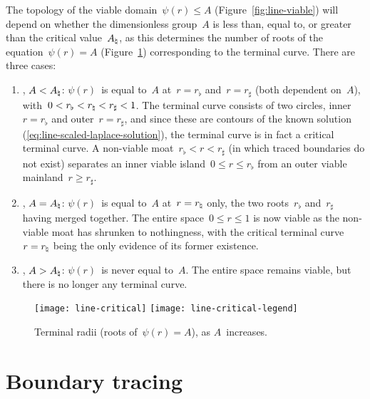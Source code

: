 The topology of the viable domain~$\psi (r) \le A$
(Figure~\ref{fig:line-viable})
will depend on whether the dimensionless group~$A$ is
less than, equal to, or greater than the critical value~$A_\natural$,
as this determines the number of roots of the equation~$\psi (r) = A$
(Figure~\ref{fig:line-critical})
corresponding to the terminal curve.
There are three cases:
\begin{enumerate}
  \item
  \label{itm:polar.cases.hot}
    , $A < A_\natural$:
    $\psi (r)$~is equal to~$A$ at~$r = r_\flat$ and~$r = r_\sharp$
    (both dependent on~$A$),
    with~$0 <  r_\flat < r_\natural < r_\sharp < 1$.
    The terminal curve consists of two circles,
    inner~$r = r_\flat$ and outer~$r = r_\sharp$,
    and since these are contours of the known solution~%
      (\ref{eq:line-scaled-laplace-solution}),
    the terminal curve is in fact a critical terminal curve.
    A non-viable moat~$r_\flat < r < r_\sharp$
    (in which traced boundaries do not exist)
    separates an inner viable island~$0 \le r \le r_\flat$
    from an outer viable mainland~$r \ge r_\sharp$.
  \item
    , $A = A_\natural$:
    $\psi (r)$~is equal to~$A$ at~$r = r_\natural$ only,
    the two roots~$r_\flat$ and~$r_\sharp$ having merged together.
    The entire space~$0 \le r \le 1$ is now viable
    as the non-viable moat has shrunken to nothingness,
    with the critical terminal curve~$r = r_\natural$
    being the only evidence of its former existence.
  \item
    , $A > A_\natural$:
    $\psi (r)$~is never equal to~$A$.
    The entire space remains viable,
    but there is no longer any terminal curve.
\end{enumerate}

\begin{figure}
  \newcommand*{\legendoffsetheight}{0.2\textwidth}
  \centering
  \texttt{[image: line-critical]}
  \texttt{[image: line-critical-legend]}
  \caption{
    Terminal radii (roots of~$\psi (r) = A$),
    as $A$~increases.
  }
  \label{fig:line-critical}
\end{figure}

\section{Boundary tracing}
\label{sec:polar.tracing}

